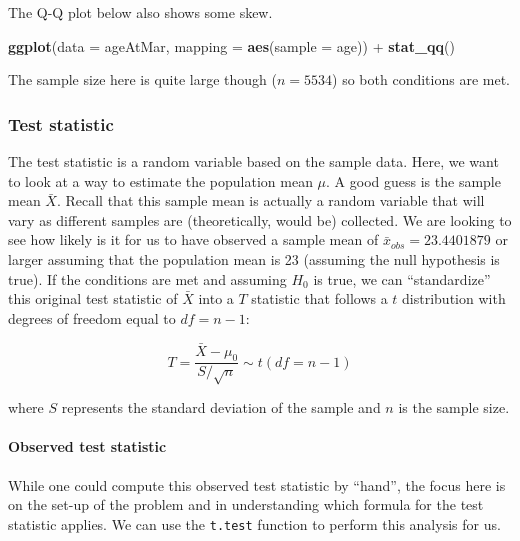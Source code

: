 \documentclass[]{tufte-book}
\newenvironment{Shaded}{\begin{snugshade}}{\end{snugshade}}
\newcommand{\KeywordTok}[1]{\textcolor[rgb]{0.13,0.29,0.53}{\textbf{{#1}}}}
\newcommand{\DataTypeTok}[1]{\textcolor[rgb]{0.13,0.29,0.53}{{#1}}}
\newcommand{\DecValTok}[1]{\textcolor[rgb]{0.00,0.00,0.81}{{#1}}}
\newcommand{\StringTok}[1]{\textcolor[rgb]{0.31,0.60,0.02}{{#1}}}
\newcommand{\NormalTok}[1]{{#1}}
\begin{document}
The Q-Q plot below also shows some skew.

\begin{Shaded}
\begin{Highlighting}[]
\KeywordTok{ggplot}\NormalTok{(}\DataTypeTok{data =} \NormalTok{ageAtMar, }\DataTypeTok{mapping =} \KeywordTok{aes}\NormalTok{(}\DataTypeTok{sample =} \NormalTok{age)) +}
\StringTok{  }\KeywordTok{stat_qq}\NormalTok{()}
\end{Highlighting}
\end{Shaded}

The sample size here is quite large though (\(n = 5534\)) so both
conditions are met.

\subsubsection{Test statistic}\label{test-statistic}

The test statistic is a random variable based on the sample data. Here,
we want to look at a way to estimate the population mean \(\mu\). A good
guess is the sample mean \(\bar{X}\). Recall that this sample mean is
actually a random variable that will vary as different samples are
(theoretically, would be) collected. We are looking to see how likely is
it for us to have observed a sample mean of
\(\bar{x}_{obs} = 23.4401879\) or larger assuming that the population
mean is 23 (assuming the null hypothesis is true). If the conditions are
met and assuming \(H_0\) is true, we can ``standardize'' this original
test statistic of \(\bar{X}\) into a \(T\) statistic that follows a
\(t\) distribution with degrees of freedom equal to \(df = n - 1\):

\[ T =\dfrac{ \bar{X} - \mu_0}{ S / \sqrt{n} } \sim t (df = n - 1) \]

where \(S\) represents the standard deviation of the sample and \(n\) is
the sample size.

\paragraph{Observed test statistic}\label{observed-test-statistic}

While one could compute this observed test statistic by ``hand'', the
focus here is on the set-up of the problem and in understanding which
formula for the test statistic applies. We can use the \texttt{t.test}
function to perform this analysis for us.

\begin{Shaded}
\end{Shaded}
\end{document}

